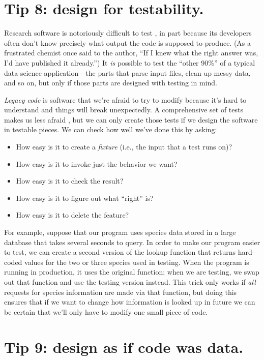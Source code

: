 \documentclass[10pt,letterpaper]{article}
\begin{document}
\section*{Tip 8: design for testability.}

Research software is notoriously difficult to test \cite{Hook2009,Kanewala2014},
in part because its developers often don't know precisely what output the code is supposed to produce.
(As a frustrated chemist once said to the author,
``If I knew what the right answer was, I'd have published it already.'')
It \emph{is} possible to test the ``other 90\%'' of a typical data science application---the parts that
parse input files,
clean up messy data,
and so on,
but only if those parts are designed with testing in mind.

\emph{Legacy code} is software that we're afraid to try to modify
because it's hard to understand and things will break unexpectedly.
A comprehensive set of tests makes us less afraid \cite{Feathers2004},
but we can only create those tests if we design the software in testable pieces.
We can check how well we've done this by asking:

\begin{itemize}
\item
  How easy is it to create a \emph{fixture}
  (i.e., the input that a test runs on)?
\item
  How easy is it to invoke just the behavior we want?
\item
  How easy is it to check the result?
\item
  How easy is it to figure out what ``right'' is?
\item
  How easy is it to delete the feature?
\end{itemize}

For example,
suppose that our program uses species data stored in a large database
that takes several seconds to query.
In order to make our program easier to test,
we can create a second version of the lookup function
that returns hard-coded values for
the two or three species used in testing.
When the program is running in production,
it uses the original function;
when we are testing,
we swap out that function and use the testing version instead.
This trick only works if \emph{all} requests for species information
are made via that function,
but doing this ensures that if we want to change how information is looked up in future
we can be certain that we'll only have to modify one small piece of code.
  
\section*{Tip 9: design as if code was data.}
\end{document}
